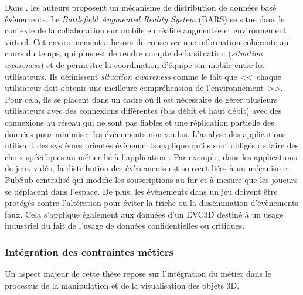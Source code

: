 %
Dans \cite{Brown2003}, les auteurs proposent un mécanisme de distribution de 
données basé évènements. Le \textit{Battlefield Augmented Reality System} 
(BARS) se situe dans le contexte de la collaboration sur mobile en réalité 
augmentée et environnement virtuel. Cet environnement a besoin de conserver 
une information cohérente au cours du temps, qui plus est de rendre compte de la 
situation (\textit{situation awareness}) et de permettre la coordination d'équipe sur 
mobile entre les utilisateurs. Ils définissent \textit{situation awareness} comme le 
fait que <<~chaque utilisateur doit obtenir une meilleure compréhension de 
l'environnement~>>. Pour cela, ils se placent dans un cadre où il est nécessaire 
de gérer plusieurs utilisateurs avec des connexions différentes (bas débit et haut 
débit) avec des connexions au réseau qui ne sont pas fiables et une réplication 
partielle des données pour minimiser les évènements non voulus.
L'analyse des applications utilisant des systèmes orientés évènements explique 
qu'ils sont obligés de faire des choix spécifiques au métier lié à l'application 
\cite{Hinze2009}. Par exemple, dans les applications de jeux vidéo, la distribution 
des évènements est souvent liées à un mécanisme \gls{PubSub} centralisé qui 
modifie les souscriptions au fur et à mesure que les joueurs se déplacent dans 
l'espace. De plus, les évènements dans un jeu doivent être protégés contre 
l'altération pour éviter la triche ou la dissémination d'évènements faux. Cela 
s'applique également aux données d'un \gls{EVC3D} destiné à un usage industriel 
du fait de l'usage de données confidentielles ou critiques.

\subsubsection{Intégration des contraintes métiers}
Un aspect majeur de cette thèse repose sur l'intégration du métier dans le 
processus de la manipulation et de la visualisation des objets 3D.
